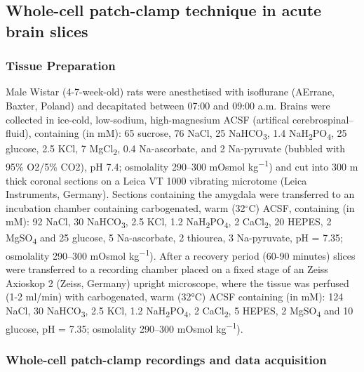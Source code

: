 \documentclass[
]{article}
\begin{document}
\hypertarget{whole-cell-patch-clamp-technique-in-acute-brain-slices}{%
\subsection{Whole-cell patch-clamp technique in acute brain
slices}\label{whole-cell-patch-clamp-technique-in-acute-brain-slices}}

\hypertarget{tissue-preparation}{%
\subsubsection{Tissue Preparation}\label{tissue-preparation}}

Male Wistar (4-7-week-old) rats were anesthetised with isoflurane
(AErrane, Baxter, Poland) and decapitated between 07:00 and 09:00 a.m.
Brains were collected in ice-cold, low-sodium, high-magnesium ACSF
(artifical cerebrospinal--fluid), containing (in mM): 65 sucrose, 76
NaCl, 25 NaHCO\textsubscript{3}, 1.4
NaH\textsubscript{2}PO\textsubscript{4}, 25 glucose, 2.5 KCl, 7
MgCl\textsubscript{2}, 0.4 Na-ascorbate, and 2 Na-pyruvate (bubbled with
95\% O2/5\% CO2), pH 7.4; osmolality 290--300 mOsmol
kg\textsuperscript{−1}) and cut into 300 \mu m thick coronal sections on
a Leica VT 1000 vibrating microtome (Leica Instruments, Germany).
Sections containing the amygdala were transferred to an incubation
chamber containing carbogenated, warm (32\(^{\circ}\)C) ACSF, containing
(in mM): 92 NaCl, 30 NaHCO\textsubscript{3}, 2.5 KCl, 1.2
NaH\textsubscript{2}PO\textsubscript{4}, 2 CaCl\textsubscript{2}, 20
HEPES, 2 MgSO\textsubscript{4} and 25 glucose, 5 Na-ascorbate, 2
thiourea, 3 Na-pyruvate, pH = 7.35; osmolality 290--300 mOsmol
kg\textsuperscript{−1}). After a recovery period (60-90 minutes) slices
were transferred to a recording chamber placed on a fixed stage of an
Zeiss Axioskop 2 (Zeiss, Germany) upright microscope, where the tissue
was perfused (1-2 ml/min) with carbogenated, warm (32°C) ACSF containing
(in mM): 124 NaCl, 30 NaHCO\textsubscript{3}, 2.5 KCl, 1.2
NaH\textsubscript{2}PO\textsubscript{4}, 2 CaCl\textsubscript{2}, 5
HEPES, 2 MgSO\textsubscript{4} and 10 glucose, pH = 7.35; osmolality
290--300 mOsmol kg\textsuperscript{−1}).

\hypertarget{whole-cell-patch-clamp-recordings-and-data-acquisition}{%
\subsubsection{Whole-cell patch-clamp recordings and data
acquisition}\label{whole-cell-patch-clamp-recordings-and-data-acquisition}}
\end{document}
